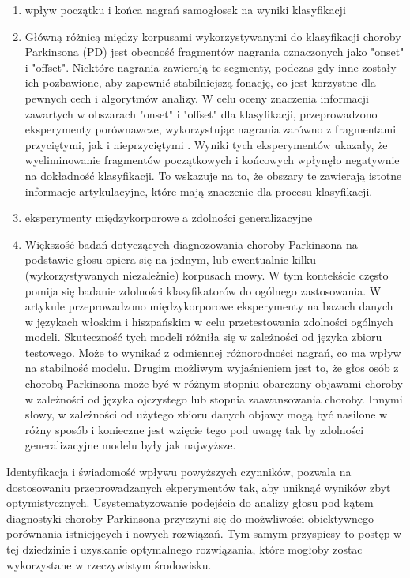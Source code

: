 \begin{enumerate}[label={\alph*)}]
	\item wpływ początku i końca  nagrań samogłosek na wyniki klasyfikacji
\item[] Główną różnicą między korpusami wykorzystywanymi do klasyfikacji choroby Parkinsona (PD) jest obecność fragmentów nagrania oznaczonych jako "onset" i "offset".
Niektóre nagrania zawierają te segmenty, podczas gdy inne zostały ich pozbawione, aby zapewnić stabilniejszą fonację, co jest korzystne dla pewnych cech i algorytmów analizy.
W celu oceny znaczenia informacji zawartych w obszarach "onset" i "offset" dla klasyfikacji, przeprowadzono eksperymenty porównawcze,
wykorzystując nagrania zarówno z fragmentami przyciętymi, jak i nieprzyciętymi \cite{SustainedVowelsProblems}.
Wyniki tych eksperymentów ukazały, że wyeliminowanie fragmentów początkowych i końcowych wpłynęło negatywnie na dokładność klasyfikacji.
To wskazuje na to, że obszary te zawierają istotne informacje artykulacyjne, które mają znaczenie dla procesu klasyfikacji.

 	\item eksperymenty międzykorporowe a zdolności generalizacyjne
	\item [] Większość badań dotyczących diagnozowania choroby Parkinsona na podstawie głosu opiera się na jednym, lub ewentualnie kilku (wykorzystywanych niezależnie)
korpusach mowy.
W tym kontekście często pomija się badanie zdolności klasyfikatorów do ogólnego zastosowania.
W artykule \cite{SustainedVowelsProblems} przeprowadzono międzykorporowe eksperymenty na bazach danych w językach włoskim i hiszpańskim w celu
przetestowania zdolności ogólnych modeli. Skuteczność tych modeli różniła się w zależności od języka zbioru testowego.
Może to wynikać z odmiennej różnorodności nagrań, co ma wpływ na stabilność modelu.
Drugim możliwym wyjaśnieniem jest to, że głos osób z chorobą Parkinsona może być w różnym stopniu obarczony objawami choroby w zależności od języka ojczystego lub stopnia zaawansowania choroby.
Innymi słowy, w zależności od użytego zbioru danych objawy mogą być nasilone w różny sposób i konieczne jest wzięcie tego pod uwagę tak by zdolności generalizacyjne modelu były jak najwyższe.
\end{enumerate}


Identyfikacja i świadomość wpływu powyższych czynników, pozwala na dostosowaniu przeprowadzanych ekperymentów tak, aby uniknąć wyników zbyt optymistycznych.
Usystematyzowanie podejścia do analizy głosu pod kątem diagnostyki choroby Parkinsona przyczyni się do możwliwości obiektywnego porównania istniejących i nowych rozwiązań.
Tym samym przyspiesy to postęp w tej dziedzinie i uzyskanie optymalnego rozwiązania, które mogłoby zostac wykorzystane w rzeczywistym środowisku.

